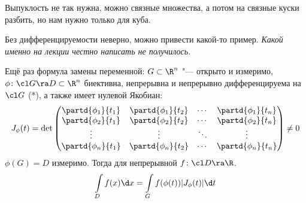 \begin{Rem}
	Выпуклость не так нужна, можно связные множества, а потом на связные куски разбить, но нам нужно только для куба.
\end{Rem}

\begin{Rem}
	Без дифференцируемости неверно, можно привести какой-то пример.
	\textit{Какой именно на лекции честно написать не получилось.}
\end{Rem}

Ещё раз формула замены переменной:
$G \subset \R^n$ "--- открыто и измеримо, \\
$\phi\colon \cl G \ra D \subset \R^n$ биективна, непрерывна и непрерывно дифференцируема на $\cl G$ (*), а также имеет нулевой Якобиан:
\[
	J_\phi(t) = \det
	\begin{pmatrix}
		\partd{\phi_1}{t_1} & \partd{\phi_1}{t_2} & \cdots & \partd{\phi_1}{t_n} \\
		\partd{\phi_2}{t_1} & \partd{\phi_2}{t_2} & \cdots & \partd{\phi_2}{t_n} \\
		\vdots              & \vdots              & \ddots & \vdots              \\
		\partd{\phi_n}{t_1} & \partd{\phi_n}{t_2} & \cdots & \partd{\phi_n}{t_n} \\
	\end{pmatrix} \ne 0
\]
$\phi(G) = D$ измеримо.
Тогда для непрерывной $f\colon \cl D \ra \R$. 
\[
	\int\limits_D f(x) \d x = \int\limits_G f(\phi(t)) |J_\phi(t)| \d t
\]

